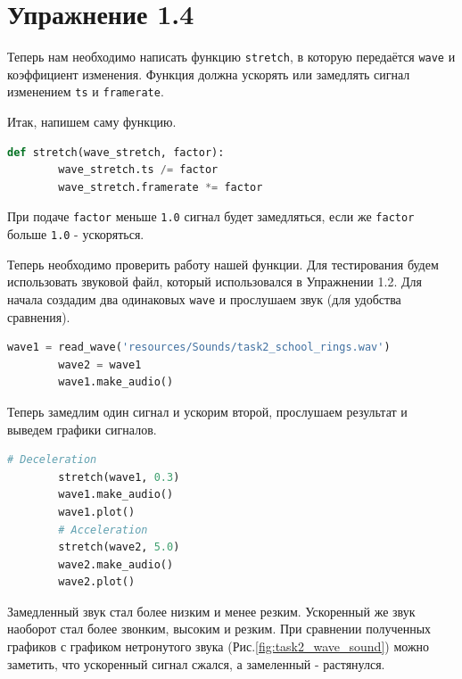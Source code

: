 \documentclass[a4paper, 14pt]{extarticle}
\begin{document}
    \newpage

    \section{Упражнение 1.4}
    \label{sec:task4}

    Теперь нам необходимо написать функцию \texttt{stretch}, в которую передаётся \texttt{wave} и коэффициент изменения.
    Функция должна ускорять или замедлять сигнал изменением \texttt{ts} и \texttt{framerate}.

    Итак, напишем саму функцию.

    \begin{lstlisting}[language=Python, caption= Описание функции \texttt{stretch}., label={lst:task4_stretch}]
    def stretch(wave_stretch, factor):
        wave_stretch.ts /= factor
        wave_stretch.framerate *= factor
    \end{lstlisting}

    При подаче \texttt{factor} меньше \texttt{1.0} сигнал будет замедляться, если же \texttt{factor} больше \texttt{1.0} - ускоряться.

    Теперь необходимо проверить работу нашей функции.
    Для тестирования будем использовать звуковой файл, который использовался в Упражнении 1.2.
    Для начала создадим два одинаковых \texttt{wave} и прослушаем звук (для удобства сравнения).

    \begin{lstlisting}[language=Python, caption= Считывание звукового файла., label={lst:print_spectrogram}]
        wave1 = read_wave('resources/Sounds/task2_school_rings.wav')
        wave2 = wave1
        wave1.make_audio()
    \end{lstlisting}

    Теперь замедлим один сигнал и ускорим второй, прослушаем результат и выведем графики сигналов.

    \begin{lstlisting}[language=Python, caption= Редактирование сигналов с помощью \texttt{factor}., label={lst:editing_signals}]
        # Deceleration
        stretch(wave1, 0.3)
        wave1.make_audio()
        wave1.plot()
        # Acceleration
        stretch(wave2, 5.0)
        wave2.make_audio()
        wave2.plot()
    \end{lstlisting}

    Замедленный звук стал более низким и менее резким. Ускоренный же звук наоборот стал более звонким, высоким и резким.
    При сравнении полученных графиков с графиком нетронутого звука (Рис.\ref{fig:task2_wave_sound}) можно заметить, что ускоренный сигнал сжался, а замеленный - растянулся.
\end{document}
